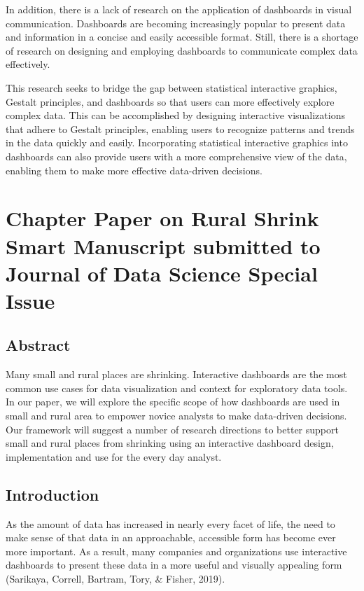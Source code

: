 \documentclass[print]{nuthesis}
\begin{document}
In addition, there is a lack of research on the application of dashboards in visual communication.
Dashboards are becoming increasingly popular to present data and information in a concise and easily accessible format.
Still, there is a shortage of research on designing and employing dashboards to communicate complex data effectively.

This research seeks to bridge the gap between statistical interactive graphics, Gestalt principles, and dashboards so that users can more effectively explore complex data.
This can be accomplished by designing interactive visualizations that adhere to Gestalt principles, enabling users to recognize patterns and trends in the data quickly and easily.
Incorporating statistical interactive graphics into dashboards can also provide users with a more comprehensive view of the data, enabling them to make more effective data-driven decisions.

\hypertarget{rmd-basics}{%
\chapter{Chapter Paper on Rural Shrink Smart Manuscript submitted to Journal of Data Science Special Issue}\label{rmd-basics}}

\hypertarget{abstract}{%
\section{Abstract}\label{abstract}}

Many small and rural places are shrinking. Interactive dashboards are the most common use cases for data visualization and context for exploratory data tools. In our paper, we will explore the specific scope of how dashboards are used in small and rural area to empower novice analysts to make data-driven decisions. Our framework will suggest a number of research directions to better support small and rural places from shrinking using an interactive dashboard design, implementation and use for the every day analyst.

\hypertarget{introduction-1}{%
\section{Introduction}\label{introduction-1}}

As the amount of data has increased in nearly every facet of life, the need to make sense of that data in an approachable, accessible form has become ever more important.
As a result, many companies and organizations use interactive dashboards to present these data in a more useful and visually appealing form (Sarikaya, Correll, Bartram, Tory, \& Fisher, 2019).
\end{document}
